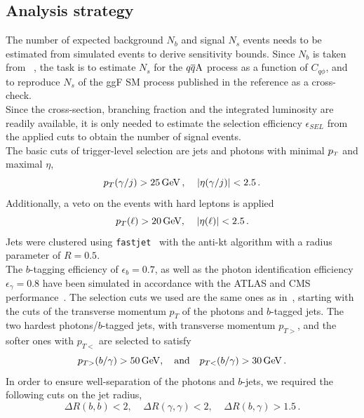 \subsection{Analysis strategy}
The number of expected background $N_b$ and signal $N_s$ events needs to be estimated from simulated events to derive sensitivity bounds. Since  $N_b$ is  taken from ~\cite{Azatov:2015oxa}, the task is to estimate $N_s$ for the $q\overline q \rm A$ process as a function of $C_{q\phi}$, and to reproduce $N_s$ of the ggF SM process published in the reference as a cross-check.\\ 
Since the cross-section, branching fraction and the integrated luminosity are readily available, it is only needed to estimate the selection efficiency $\epsilon_{SEL}$ from the applied cuts to obtain the number of signal events.\\
The basic cuts of trigger-level selection are jets and photons with minimal $p_{\scriptscriptstyle T}$ and maximal $\eta$,
\begin{equation}
	p_T(\gamma/j) > 25 \, \GeV\,, \; \; \; \; |\eta(\gamma/j)| < 2.5\,.
	\label{tricut1}
\end{equation}
Additionally, a veto on the events with hard leptons is applied  
\begin{equation}
	p_T(\ell) > 20 \, \GeV, \; \; \; \; |\eta(\ell)| < 2.5\,.
	\label{tricut2}
\end{equation}
Jets were clustered using \texttt{fastjet}~\cite{Cacciari:2011ma} with the anti-kt algorithm with a radius parameter of $R=0.5$. \\
The $b$-tagging efficiency of $ \epsilon_b = 0.7$, as well as the photon identification efficiency~$ \epsilon_\gamma = 0.8$ have been simulated in accordance with the ATLAS and CMS performance~\cite{Chatrchyan:2012dk,CMS:2013vea,ATL-PHYS-PUB-2013-009,ATL-PHYS-PUB-2013-009,CMS:2013aoa}.
The selection cuts we used are the same ones as in~\cite{Azatov:2015oxa}, starting with the cuts of the transverse momentum $p_T$ of the photons and $b$-tagged jets. The two hardest photons/$b$-tagged jets,  with transverse momentum $p_{T>}$, and the softer ones with $p_{T<}$ are selected to satisfy
\begin{equation}
	p_{T>}(b/ \gamma) > 50 \, \GeV, \quad \text{and} \quad   p_{T<}(b/ \gamma) > 30 \, \GeV\,.
	\label{cut1}
\end{equation}
In order to ensure well-separation of the photons and $b$-jets, we required the following cuts on the jet radius,
\begin{equation}
	\Delta R(b,b) < 2  ,\; \; \; \; \Delta R(\gamma,\gamma) < 2, \; \;  \; \; \Delta R(b,\gamma) > 1.5\,.
	\label{cut2}
\end{equation}
